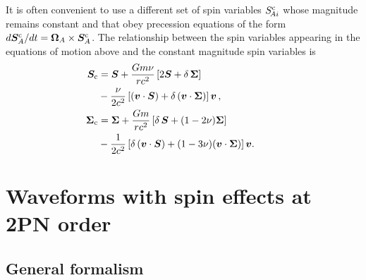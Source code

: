 \documentclass[aps, prd,
twocolumn,%
superscriptaddress,
showpacs, nofootinbib, eqsecnum, amsmath, amssymb, floatfix
]{revtex4}
\begin{document}
It is often convenient to use a different set of spin variables
$S^{\rm c}_{\!Ai}$ whose magnitude remains constant and that obey
precession equations of the form $d{\bm{S}}^{\rm
c}_A/dt=\bm{\Omega}_A \times \bm{S}_A^{\rm c}$. The relationship
between the spin variables appearing in the equations of motion
above and the constant magnitude spin variables is~\cite{
Blanchet-Buonanno-Faye:2006}
\begin{subequations}
\begin{align}
\bm{S}_{\rm c}&= \bm{S}+\frac{G m \nu}{r c^2}\left[2 \bm{S}+
\delta\,\bm{\Sigma}\right]\nonumber\\
&-\frac{\nu}{2 c^2}\left[(\bm{v}\cdot \bm{S})+
\delta\,(\bm{v}\cdot \bm{\Sigma})\right]\bm{v}\, ,\\
\bm{\Sigma}_{\rm c}&= \bm{\Sigma}+\frac{G m}{r c^2}\left[\delta\,\bm{S}
+(1-2\nu)\bm{\Sigma}\right]\nonumber\\
&-\frac{1}{2 c^2}\left[\delta\,(\bm{v}\cdot \bm{S})+
(1-3\nu)(\bm{v}\cdot \bm{\Sigma})\right]\bm{v}. \ \ \ \ \ \ \ \
\end{align}
\end{subequations}

\section{Waveforms with spin effects at 2PN order }

\subsection{General formalism}
\label{subsec:general}
\end{document}
